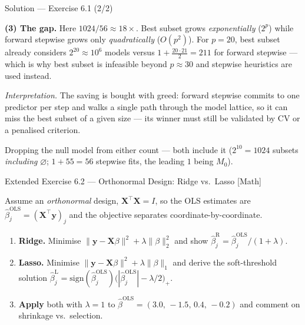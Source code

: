 \documentclass[aspectratio=169,11pt]{beamer}
\begin{document}
\begin{frame}{Solution --- Exercise 6.1 (2/2)}
  \begin{solutionbox}
    \textbf{(3) The gap.}
    Here $1024 / 56 \approx 18\times$. Best subset grows
    \emph{exponentially} ($2^p$) while forward stepwise grows only
    \emph{quadratically} ($O(p^2)$). For $p = 20$, best subset already
    considers $2^{20} \approx 10^6$ models versus
    $1 + \tfrac{20 \cdot 21}{2} = 211$ for forward stepwise --- which is
    why best subset is infeasible beyond $p \approx 30$ and stepwise
    heuristics are used instead.

    \emph{Interpretation.} The saving is bought with greed: forward
    stepwise commits to one predictor per step and walks a single path
    through the model lattice, so it can miss the best subset of a given
    size --- its winner must still be validated by CV or a penalised
    criterion.
  \end{solutionbox}
  \begin{mistake}
    Dropping the null model from either count --- both include it
    ($2^{10} = 1024$ subsets \emph{including} $\varnothing$; $1 + 55 = 56$
    stepwise fits, the leading $1$ being $M_0$).
  \end{mistake}
\end{frame}

\begin{frame}{Extended Exercise 6.2 --- Orthonormal Design: Ridge vs.\ Lasso [Math]}
  \begin{longexercise}
    Assume an \emph{orthonormal} design, $\mathbf{X}^\top\mathbf{X}=I$,
    so the OLS estimates are $\hat\beta_j^{\mathrm{OLS}}
    =(\mathbf{X}^\top\mathbf{y})_j$ and the objective separates
    coordinate-by-coordinate.
    \begin{enumerate}
      \item \textbf{Ridge.} Minimise
            $\lVert\mathbf{y}-\mathbf{X}\beta\rVert^2+\lambda
            \lVert\beta\rVert_2^2$ and show
            $\hat\beta_j^{\mathrm R}=\hat\beta_j^{\mathrm{OLS}}/(1+\lambda)$.
      \item \textbf{Lasso.} Minimise
            $\lVert\mathbf{y}-\mathbf{X}\beta\rVert^2+\lambda
            \lVert\beta\rVert_1$ and derive the soft-threshold solution
            $\hat\beta_j^{\mathrm L}
            =\mathrm{sign}(\hat\beta_j^{\mathrm{OLS}})
            \bigl(|\hat\beta_j^{\mathrm{OLS}}|-\lambda/2\bigr)_+$.
      \item \textbf{Apply} both with $\lambda=1$ to
            $\hat\beta^{\mathrm{OLS}}=(3.0,\,-1.5,\,0.4,\,-0.2)$ and
            comment on shrinkage vs.\ selection.
    \end{enumerate}
  \end{longexercise}
\end{frame}
\end{document}
